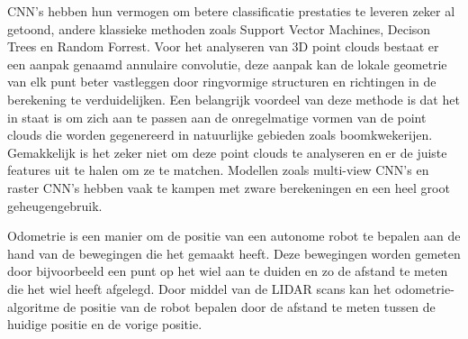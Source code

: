 CNN's hebben hun vermogen om betere classificatie prestaties te leveren zeker al getoond, andere klassieke methoden zoals Support Vector Machines, Decison Trees en Random Forrest. \autocite{8480863}
Voor het analyseren van 3D point clouds bestaat er een aanpak genaamd annulaire convolutie, deze aanpak kan de lokale geometrie van elk punt beter vastleggen door ringvormige structuren en richtingen in de berekening te verduidelijken.
Een belangrijk voordeel van deze methode is dat het in staat is om zich aan te passen aan de onregelmatige vormen van de point clouds die worden gegenereerd in natuurlijke gebieden zoals boomkwekerijen.
Gemakkelijk is het zeker niet om deze point clouds te analyseren en er de juiste features uit te halen om ze te matchen.
Modellen zoals multi-view CNN's en raster CNN's hebben vaak te kampen met zware berekeningen en een heel groot geheugengebruik.\autocite{Komarichev_2019_CVPR}

Odometrie is een manier om de positie van een autonome robot te bepalen aan de hand van de bewegingen die het gemaakt heeft.
Deze bewegingen worden gemeten door bijvoorbeeld een punt op het wiel aan te duiden en zo de afstand te meten die het wiel heeft afgelegd.
Door middel van de LIDAR scans kan het odometrie-algoritme de positie van de robot bepalen door de afstand te meten tussen de huidige positie en de vorige positie. \autocite{zhang2014loam}



